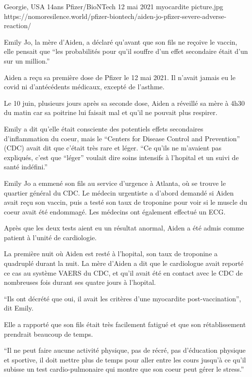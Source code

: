           {Georgie, USA}
          {14ans}
          {Pfizer/BioNTech}
          {12 mai 2021}
          {myocardite}
          {picture.jpg}
          {https://nomoresilence.world/pfizer-biontech/aiden-jo-pfizer-severe-adverse-reaction/}
          {

\normalsize 

Emily Jo, la mère d'Aiden, a déclaré qu'avant que son fils ne reçoive le vaccin,
elle pensait que “les probabilités pour qu'il souffre d'un effet secondaire
était d'un sur un million.”

Aiden a reçu sa première dose de Pfizer le 12 mai 2021. Il n'avait jamais eu le
covid ni d'antécédents médicaux, excepté de l'asthme.

Le 10 juin, plusieurs jours après sa seconde dose, Aiden a réveillé sa mère à
4h30 du matin car sa poitrine lui faisait mal et qu'il ne pouvait plus respirer.

Emily a dit qu'elle était consciente des potentiels effets secondaires
d'inflammation du coeur, mais le “Centers for Disease Control and Prevention”
(CDC) avait dit que c'était très rare et léger. “Ce qu'ils ne m'avaient pas
expliqués, c'est que “léger” voulait dire soins intensifs à l'hopital et un
suivi de santé indéfini.”

Emily Jo a emmené son fils au service d'urgence à Atlanta, où se trouve le
quartier général du CDC. Le médecin urgentiste a d'abord demandé si Aiden avait
reçu son vaccin, puis a testé son taux de troponine pour voir si le muscle du
coeur avait été endommagé. Les médecins ont également effectué un ECG.

Après que les deux tests aient eu un résultat anormal, Aiden a été admis comme
patient à l'unité de cardiologie.

La première nuit où Aiden est resté à l'hopital, son taux de troponine a
quadruplé durant la nuit. La mère d'Aiden a dit que le cardiologue avait reporté
ce cas au système VAERS du CDC, et qu'il avait été en contact avec le CDC de
nombreuses fois durant ses quatre jours à l'hopital.

“Ils ont décrété que oui, il avait les critères d'une myocardite
post-vaccination”, dit Emily.

Elle a rapporté que son fils était très facilement fatigué et que son
rétablissement prendrait beaucoup de temps.

“Il ne peut faire aucune activité physique, pas de récré, pas d'éducation
physique et sportive, il doit mettre plus de temps pour aller entre les cours
jusqu'à ce qu'il subisse un test cardio-pulmonaire qui montre que son coeur peut
gérer le stress.”

}
